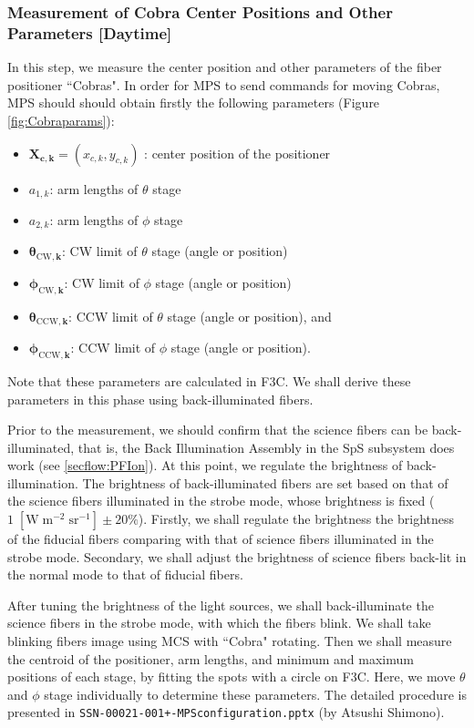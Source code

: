 \subsubsection{Measurement of Cobra Center Positions and Other Parameters [Daytime]}\label{secflow:CobraCal}

In this step, we measure the center position and other parameters of the fiber positioner ``Cobras".
In order for MPS to send commands for moving Cobras, MPS should should obtain firstly the following parameters (Figure \ref{fig:Cobraparams}):
\begin{itemize}
\item $\bm{X_{c,k}}=(x_{c,k}, y_{c,k})$ : center position of the positioner
\item $a_{1,k}$: arm lengths of $\theta$ stage
\item $a_{2,k}$: arm lengths of $\phi$ stage
\item $\bm{\theta _{\mathrm{CW},k}}$: CW limit of $\theta$ stage (angle or position)
\item $\bm{\phi _{\mathrm{CW},k}}$: CW limit of $\phi$ stage (angle or position)
\item $\bm{\theta _{\mathrm{CCW},k}}$: CCW limit of $\theta$ stage (angle or position), and
\item $\bm{\phi_{\mathrm{CCW},k}}$: CCW limit of $\phi$ stage (angle or position).
\end{itemize}
Note that these parameters are calculated in F3C.
We shall derive these parameters in this phase using back-illuminated fibers.

Prior to the measurement, we should confirm that the science fibers can be back-illuminated, that is, the Back Illumination Assembly in the SpS subsystem does work (see \ref{secflow:PFIon}).
At this point, we regulate the brightness of back-illumination.
The brightness of back-illuminated fibers are set based on that of the science fibers illuminated in the strobe mode, whose brightness is fixed ($1 \; \mathrm{[W\;m^{-2} \; sr^{-1}]} \pm 20 \%$).
Firstly, we shall regulate the brightness the brightness of the fiducial fibers comparing with that of science fibers illuminated in the strobe mode.
Secondary, we shall adjust the brightness of science fibers back-lit in the normal mode to that of fiducial fibers. 

After tuning the brightness of the light sources, we shall back-illuminate the science fibers in the strobe mode, with which the fibers blink.
We shall take blinking fibers image using MCS with ``Cobra" rotating.
Then we shall measure the centroid of the positioner, arm lengths, and minimum and maximum positions of each stage, by fitting the spots with a circle on F3C.
Here, we move $\theta$ and $\phi$ stage individually to determine these parameters.
The detailed procedure is presented in {\tt SSN-00021-001+-MPSconfiguration.pptx} (by Atsushi Shimono).

